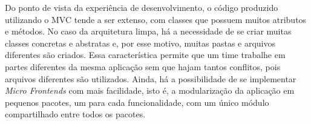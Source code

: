 Do ponto de vista da experiência de desenvolvimento, o código produzido utilizando o MVC tende a ser extenso, com classes que possuem muitos atributos e métodos.
No caso da arquitetura limpa, há a necessidade de se criar muitas classes concretas e abstratas e, por esse motivo, muitas pastas e arquivos diferentes são criados.
Essa característica permite que um time trabalhe em partes diferentes da mesma aplicação sem que hajam tantos conflitos, pois arquivos diferentes são utilizados.
Ainda, há a possibilidade de se implementar \emph{Micro Frontends} com mais facilidade, isto é, a modularização da aplicação em pequenos pacotes, um para cada funcionalidade, com um único módulo compartilhado entre todos os pacotes.
